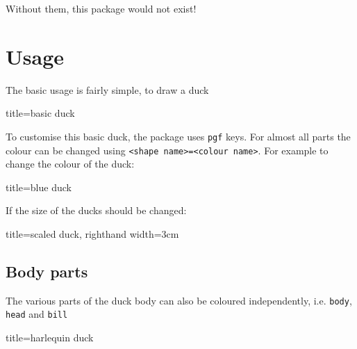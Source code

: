 \documentclass{ltxdockit}
\begin{document}
\bigskip\noindent
Without them, this package would not exist!

\newpage
\section{Usage}

The basic usage is fairly simple, to draw a duck
\begin{tcblisting}{title={basic duck}}
\begin{tikzpicture}
	\duck
\end{tikzpicture}
\end{tcblisting}

To customise this basic duck, the package uses \texttt{pgf} keys. For almost all parts the colour can be changed using \verb|<shape name>=<colour name>|. For example to change the colour of the duck:
\begin{tcblisting}{title={blue duck}}
\begin{tikzpicture}
	\duck[body=blue]
\end{tikzpicture}
\end{tcblisting}

If the size of the ducks should be changed:
\begin{tcblisting}{title={scaled duck},	righthand width=3cm}
\begin{tikzpicture}[scale=0.6]
	\duck
	\begin{scope}[xshift=90pt, scale=.3, yshift=150pt]
		\duck
	\end{scope}
	\begin{scope}[xshift=60pt, scale=.3, yshift=100pt]
		\duck
	\end{scope}
	\begin{scope}[xshift=80pt, scale=.3, yshift=50pt]
		\duck
	\end{scope}		
\end{tikzpicture}
\end{tcblisting}

\subsection{Body parts}

The various parts of the duck body can also be coloured independently, i.e. \texttt{body}, \texttt{head} and \texttt{bill}
\begin{tcblisting}{title={harlequin duck}}
\begin{tikzpicture}
	\duck[body=yellow,
		head=yellow!50!orange, 
		bill=red]
\end{tikzpicture}
\end{tcblisting}
\end{document}
